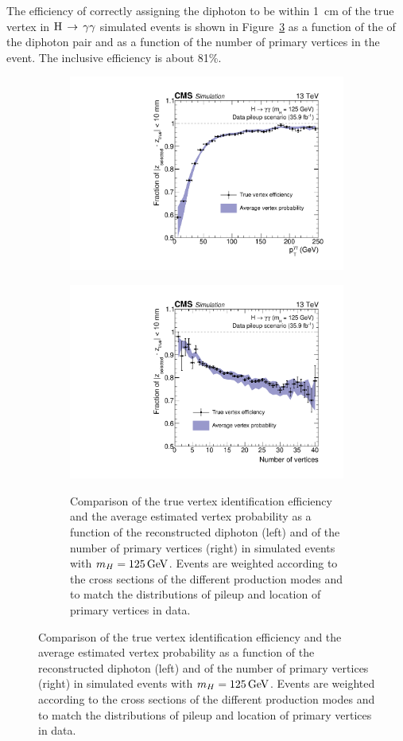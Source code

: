 The efficiency of correctly assigning the diphoton to be within
\SI{1}{cm} of the true vertex in $\mathrm{H}\,\rightarrow\,\gamma\gamma$ simulated events is shown in
Figure~\ref{fig:obj_vtxprob} as a function of the \pt of the diphoton
pair and as a function of the number of primary vertices in the event.
The inclusive efficiency is about 81\%.

\begin{figure}[h!]
  \centering
  \begin{subfigure}{0.45\textwidth}
    \includegraphics[width=\textwidth]{Figures/Objects/vtxprob_vspt}
    \label{fig:obj_vtxprob_vspt}
  \end{subfigure}
  \begin{subfigure}{0.45\textwidth}
    \includegraphics[width=\textwidth]{Figures/Objects/vtxprob_vsnvtx}
    \label{fig:obj_vtxprob_vsnvtx}
  \caption{
  Comparison of the true vertex identification efficiency and the average estimated
  vertex probability as a function of the reconstructed diphoton \pt (left) and of the number of
  primary vertices (right) in simulated \Hgg events with $m_{H} = \SI{125}{GeV}$. Events are weighted
  according to the cross sections of the different production modes and to match the distributions
  of pileup and location of primary vertices in data.
  }
  \label{fig:obj_vtxprob}
  \end{subfigure}
\end{figure}

